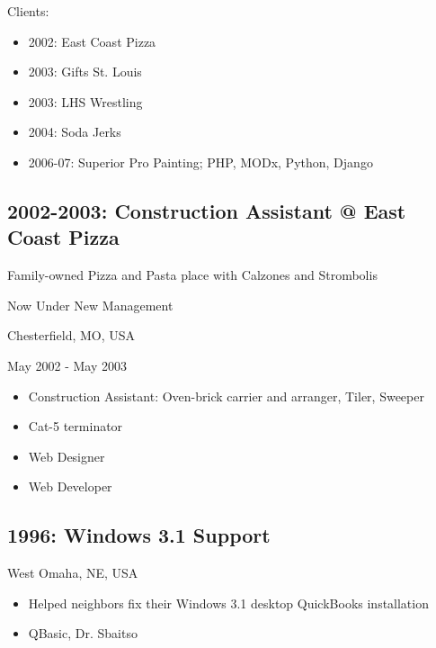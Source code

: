 \documentclass[letter,,openany,oneside,english]{sphinxhowto}
\begin{document}
Clients:
\begin{itemize}
\item {} 
2002: East Coast Pizza

\item {} 
2003: Gifts St. Louis

\item {} 
2003: LHS Wrestling

\item {} 
2004: Soda Jerks

\item {} 
2006-07: Superior Pro Painting; PHP, MODx, Python, Django

\end{itemize}


\subsection{2002-2003: Construction Assistant @ East Coast Pizza}
\label{\detokenize{resume:construction-assistant-east-coast-pizza}}
\begin{DUlineblock}{0em}
\item[] Family-owned Pizza and Pasta place with Calzones and Strombolis
\item[] Now Under New Management
\item[] Chesterfield, MO, USA
\item[] May 2002 - May 2003
\end{DUlineblock}
\begin{itemize}
\item {} 
Construction Assistant: Oven-brick carrier and arranger, Tiler, Sweeper

\item {} 
Cat-5 terminator

\item {} 
Web Designer

\item {} 
Web Developer

\end{itemize}


\subsection{1996: Windows 3.1 Support}
\label{\detokenize{resume:windows-3-1-support}}
\begin{DUlineblock}{0em}
\item[] West Omaha, NE, USA
\end{DUlineblock}
\begin{itemize}
\item {} 
Helped neighbors fix their Windows 3.1 desktop QuickBooks installation

\item {} 
QBasic, Dr. Sbaitso

\end{itemize}
\end{document}
